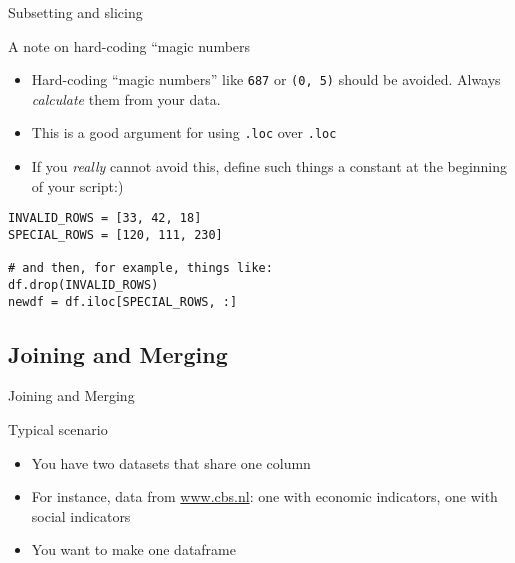 \begin{frame}[fragile]{Subsetting and slicing }
  \begin{block}{A note on hard-coding ``magic numbers}
    \begin{itemize}
    \item Hard-coding ``magic numbers'' like \texttt{687} or \texttt{(0, 5)} should be avoided. Always \emph{calculate} them from your data.
    \item This is a good argument for using \texttt{.loc} over \texttt{.loc}
    \item If you \emph{really} cannot avoid this, define such things a constant at the beginning of your script:)      
    \end{itemize}
  \end{block}

\begin{verbatim}
INVALID_ROWS = [33, 42, 18]
SPECIAL_ROWS = [120, 111, 230]

# and then, for example, things like:
df.drop(INVALID_ROWS)
newdf = df.iloc[SPECIAL_ROWS, :]
\end{verbatim}
  
\end{frame}



\subsection{Joining and Merging}

\begin{frame}{Joining and Merging}
\begin{block}{Typical scenario}
	\begin{itemize}
		\item You have two datasets that share one column
		\item For instance, data from \url{www.cbs.nl}: one with economic indicators, one with social indicators
		\item You want to make one dataframe
	\end{itemize}
\end{block}
\end{frame}




{
	\begin{frame}[plain]
\end{frame}
	\begin{frame}[plain]
\end{frame}
}

